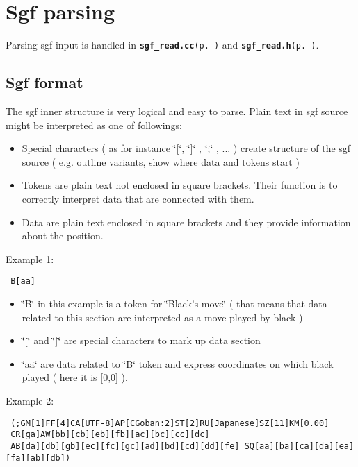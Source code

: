 \section{Sgf parsing}\label{page_5}
Parsing sgf input is handled in {\tt {\bf sgf\_\-read.cc}{\rm (p.\,\pageref{sgf__read_8cc})}} and {\tt {\bf sgf\_\-read.h}{\rm (p.\,\pageref{sgf__read_8h})}}.\subsection{Sgf format}\label{page_5_page_5__sec_1}
The sgf inner structure is very logical and easy to parse. Plain text in sgf source might be interpreted as one of followings:\begin{itemize}
\item Special characters ( as for instance \char`\"{}[\char`\"{}, \char`\"{}]\char`\"{} , \char`\"{};\char`\"{} , ... ) create structure of the sgf source ( e.g. outline variants, show where data and tokens start )\item Tokens are plain text not enclosed in square brackets. Their function is to correctly interpret data that are connected with them.\item Data are plain text enclosed in square brackets and they provide information about the position.\end{itemize}


Example 1: 

\footnotesize\begin{verbatim} B[aa] 
\end{verbatim}
\normalsize


\begin{itemize}
\item \char`\"{}B\char`\"{} in this example is a token for \char`\"{}Black's move\char`\"{} ( that means that data related to this section are interpreted as a move played by black )\item \char`\"{}[\char`\"{} and \char`\"{}]\char`\"{} are special characters to mark up data section\item \char`\"{}aa\char`\"{} are data related to \char`\"{}B\char`\"{} token and express coordinates on which black played ( here it is [0,0] ).\end{itemize}


Example 2: 

\footnotesize\begin{verbatim} (;GM[1]FF[4]CA[UTF-8]AP[CGoban:2]ST[2]RU[Japanese]SZ[11]KM[0.00] 
 CR[ga]AW[bb][cb][eb][fb][ac][bc][cc][dc]
 AB[da][db][gb][ec][fc][gc][ad][bd][cd][dd][fe] SQ[aa][ba][ca][da][ea][fa][ab][db]) 
\end{verbatim}
\normalsize


